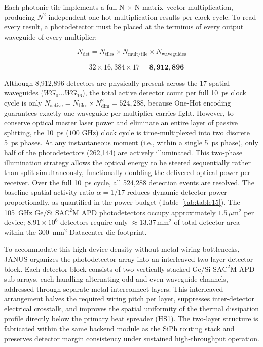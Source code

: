 \documentclass[journal]{IEEEtran}
\begin{document}
Each photonic tile implements a full N $\times$ N matrix--vector multiplication, producing $N^{2}$ independent one-hot multiplication
results per clock cycle. To read every result, a photodetector must be placed at the terminus of every output waveguide of every multiplier:

\begin{equation}
N_{\mathrm{det}} = N_{\mathrm{tiles}} \times N_{\mathrm{mult/tile}} \times N_{\mathrm{waveguides}}
\end{equation}

\begin{equation}
= 32 \times 16{,}384 \times 17 = \mathbf{8{,}912{,}896}
\end{equation}

Although 8,912,896 detectors are physically present across the 17 spatial waveguides ($WG_0 \dots WG_{16}$), the total active detector count per full 10~ps clock cycle is only $N_{\text{active}} = N_{\text{tiles}} \times N_{\text{dim}}^2 = 524{,}288$, because One-Hot encoding guarantees exactly one waveguide per multiplier carries light. However, to conserve optical master laser power and eliminate an entire layer of passive splitting, the 10~ps ($100\text{ GHz}$) clock cycle is time-multiplexed into two discrete 5~ps phases. At any instantaneous moment (i.e., within a single 5~ps phase), only half of the photodetectors (262,144) are actively illuminated. This two-phase illumination strategy allows the optical energy to be steered sequentially rather than split simultaneously, functionally doubling the delivered optical power per receiver. Over the full 10~ps cycle, all 524,288 detection events are resolved. The baseline spatial activity ratio $\alpha = 1/17$ reduces dynamic detector power proportionally, as quantified in the power budget (Table~\ref{tab:table15}). The 105~GHz Ge/Si $\mathrm{SAC^2M}$ APD photodetectors occupy approximately $1.5\,\mu\text{m}^2$ per device; $8.91 \times 10^{6}$ detectors require only $\approx 13.37\,\text{mm}^2$ of total detector area within the 300~$\text{mm}^{2}$ Datacenter die footprint.

To accommodate this high device density without metal wiring bottlenecks, JANUS organizes the photodetector array into an interleaved two-layer detector block. Each detector block consists of two vertically stacked Ge/Si $\mathrm{SAC^2M}$ APD sub-arrays, each handling alternating odd and even waveguide channels, addressed through separate metal interconnect layers. This interleaved arrangement halves the required wiring pitch per layer, suppresses inter-detector electrical crosstalk, and improves the spatial uniformity of the thermal dissipation profile directly below the primary heat spreader (HS1). The two-layer structure is fabricated within the same backend module as the SiPh routing stack and preserves detector margin consistency under sustained high-throughput operation.
\end{document}
